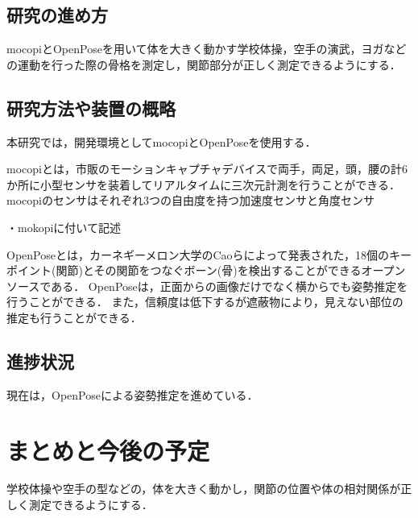 \documentclass[titlepage]{jarticle}
\begin{document}
%
%
\subsection{研究の進め方}
%
mocopiとOpenPoseを用いて体を大きく動かす学校体操，空手の演武，ヨガなどの運動を行った際の骨格を測定し，関節部分が正しく測定できるようにする．
%
%
%
\subsection{研究方法や装置の概略}
%
本研究では，開発環境としてmocopiとOpenPoseを使用する．

mocopi\cite{mocopi}とは，市販のモーションキャプチャデバイスで両手，両足，頭，腰の計6か所に小型センサを装着してリアルタイムに三次元計測を行うことができる．
mocopiのセンサはそれぞれ3つの自由度を持つ加速度センサと角度センサ

・mokopiに付いて記述


OpenPose\cite{openpose}とは，カーネギーメロン大学のCaoらによって発表された，18個のキーポイント(関節)とその関節をつなぐボーン(骨)を検出することができるオープンソースである．
OpenPoseは，正面からの画像だけでなく横からでも姿勢推定を行うことができる．
また，信頼度は低下するが遮蔽物により，見えない部位の推定も行うことができる．
%

%
%
%
\subsection{進捗状況}
%
現在は，OpenPoseによる姿勢推定を進めている．
%
%
%

%

%
%
%
\section{まとめと今後の予定}
学校体操や空手の型などの，体を大きく動かし，関節の位置や体の相対関係が正しく測定できるようにする．
%
%

\begin{thebibliography}{99}
  \small{
  }
\end{thebibliography}
\end{document}
